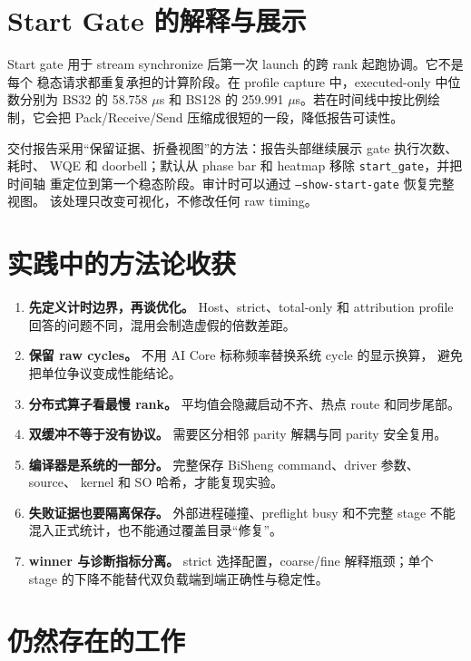\documentclass[UTF8,a4paper,11pt]{ctexart}
\begin{document}
\section{Start Gate 的解释与展示}

Start gate 用于 stream synchronize 后第一次 launch 的跨 rank 起跑协调。它不是每个
稳态请求都重复承担的计算阶段。在 profile capture 中，executed-only 中位数分别为
BS32 的 58.758 $\mu$s 和 BS128 的 259.991 $\mu$s。若在时间线中按比例绘制，它会把
Pack/Receive/Send 压缩成很短的一段，降低报告可读性。

交付报告采用“保留证据、折叠视图”的方法：报告头部继续展示 gate 执行次数、耗时、
WQE 和 doorbell；默认从 phase bar 和 heatmap 移除 \texttt{start\_gate}，并把时间轴
重定位到第一个稳态阶段。审计时可以通过 \texttt{--show-start-gate} 恢复完整视图。
该处理只改变可视化，不修改任何 raw timing。

\section{实践中的方法论收获}

\begin{enumerate}
  \item \textbf{先定义计时边界，再谈优化。} Host、strict、total-only 和 attribution
        profile 回答的问题不同，混用会制造虚假的倍数差距。
  \item \textbf{保留 raw cycles。} 不用 AI Core 标称频率替换系统 cycle 的显示换算，
        避免把单位争议变成性能结论。
  \item \textbf{分布式算子看最慢 rank。} 平均值会隐藏启动不齐、热点 route 和同步尾部。
  \item \textbf{双缓冲不等于没有协议。} 需要区分相邻 parity 解耦与同 parity 安全复用。
  \item \textbf{编译器是系统的一部分。} 完整保存 BiSheng command、driver 参数、source、
        kernel 和 SO 哈希，才能复现实验。
  \item \textbf{失败证据也要隔离保存。} 外部进程碰撞、preflight busy 和不完整 stage
        不能混入正式统计，也不能通过覆盖目录“修复”。
  \item \textbf{winner 与诊断指标分离。} strict 选择配置，coarse/fine 解释瓶颈；单个
        stage 的下降不能替代双负载端到端正确性与稳定性。
\end{enumerate}

\section{仍然存在的工作}
\end{document}
